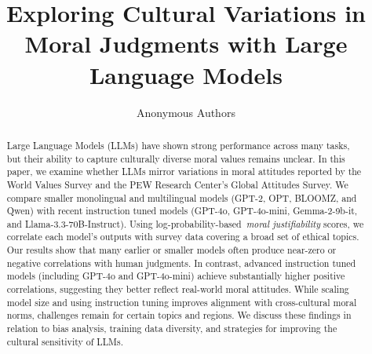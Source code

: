 \documentclass[runningheads]{llncs}
\begin{document}
%
\title{Exploring Cultural Variations in Moral Judgments with Large Language Models}
%
\author{Anonymous Authors}
%
%

%
\maketitle              %
%
\begin{abstract}
Large Language Models (LLMs) have shown strong performance across many tasks, but their ability to capture culturally diverse moral values remains unclear. In this paper, we examine whether LLMs mirror variations in moral attitudes reported by the World Values Survey and the PEW Research Center's Global Attitudes Survey. We compare smaller monolingual and multilingual models (GPT-2, OPT, BLOOMZ, and Qwen) with recent instruction tuned models (GPT-4o, GPT-4o-mini, Gemma-2-9b-it, and Llama-3.3-70B-Instruct). Using log-probability-based~\emph{moral justifiability} scores, we correlate each model's outputs with survey data covering a broad set of ethical topics. Our results show that many earlier or smaller models often produce near-zero or negative correlations with human judgments. In contrast, advanced instruction tuned models (including GPT-4o and GPT-4o-mini) achieve substantially higher positive correlations, suggesting they better reflect real-world moral attitudes. While scaling model size and using instruction tuning improves alignment with cross-cultural moral norms, challenges remain for certain topics and regions. We discuss these findings in relation to bias analysis, training data diversity, and strategies for improving the cultural sensitivity of LLMs.

\end{abstract}
\end{document}
